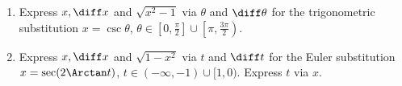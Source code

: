 \begin{enumerate}[ref={\fcProblemRef}]
\item \label{problemTheoreticalTrigSubx=sect} Express $x, \diff x $ and $\sqrt{x^2-1 }$ via $\theta$ and $\diff \theta$ for the trigonometric substitution $x=\csc \theta $, $\theta\in \left[0, \frac{\pi}{2}\right]\cup \left[\pi, \frac{3\pi}{2} \right) $.
\item \label{problemTheoreticalTrigSubx=sec(2arctant)} Express $x, \diff x $ and $\sqrt{1-x^2}$ via $t$ and $\diff t$ for the Euler substitution $x=\sec(2\Arctan t)$, $t\in (-\infty, -1)\cup[1,0)$. Express $t$ via $x$.
\end{enumerate}
